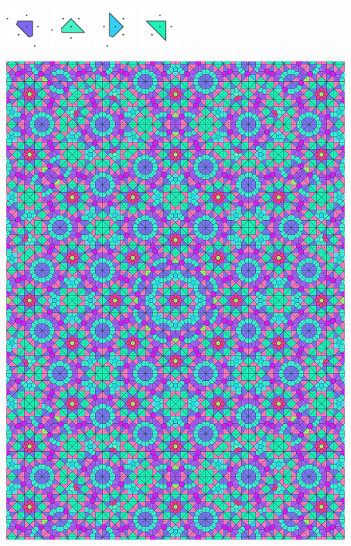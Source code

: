 \documentclass[text.tex]{subfiles}
\begin{document}
\begin{figure}[h!]
\includegraphics[width=0.12\textwidth]{img/results/octagon/octagon_107106_(-11_5alpha_1)_014.pdf}
\includegraphics[width=0.12\textwidth]{img/results/octagon/octagon_107106_(-11_5alpha_1)_015.pdf}
\includegraphics[width=0.12\textwidth]{img/results/octagon/octagon_107106_(-11_5alpha_1)_016.pdf}
\includegraphics[width=0.12\textwidth]{img/results/octagon/octagon_107106_(-11_5alpha_1)_017.pdf}
\end{figure}

\begin{figure}[h!]
\centering
\includegraphics[width=1\textwidth]{img/results/octagon/quasi_polygon-octagon_107106_(-11_5alpha_1).pdf}
\end{figure}
\end{document}

